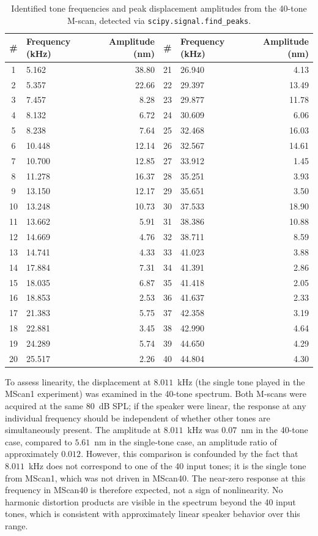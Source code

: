 \documentclass[10pt]{article}
\begin{document}
\begin{table}[ht]
  \centering
  \caption{Identified tone frequencies and peak displacement amplitudes from the 40-tone M-scan, detected via \texttt{scipy.signal.find\_peaks}.}
  \label{tab:40tones}
  \small
  \begin{tabular}{clr|clr}
    \hline
    \# & Frequency (kHz) & Amplitude (nm) & \# & Frequency (kHz) & 
    Amplitude (nm) \\
    \hline
    1  & 5.162  & 38.80 & 21 & 26.940 & 4.13  \\
    2  & 5.357  & 22.66 & 22 & 29.397 & 13.49 \\
    3  & 7.457  & 8.28  & 23 & 29.877 & 11.78 \\
    4  & 8.132  & 6.72  & 24 & 30.609 & 6.06  \\
    5  & 8.238  & 7.64  & 25 & 32.468 & 16.03 \\
    6  & 10.448 & 12.14 & 26 & 32.567 & 14.61 \\
    7  & 10.700 & 12.85 & 27 & 33.912 & 1.45  \\
    8  & 11.278 & 16.37 & 28 & 35.251 & 3.93  \\
    9  & 13.150 & 12.17 & 29 & 35.651 & 3.50  \\
    10 & 13.248 & 10.73 & 30 & 37.533 & 18.90 \\
    11 & 13.662 & 5.91  & 31 & 38.386 & 10.88 \\
    12 & 14.669 & 4.76  & 32 & 38.711 & 8.59  \\
    13 & 14.741 & 4.33  & 33 & 41.023 & 3.88  \\
    14 & 17.884 & 7.31  & 34 & 41.391 & 2.86  \\
    15 & 18.035 & 6.87  & 35 & 41.418 & 2.05  \\
    16 & 18.853 & 2.53  & 36 & 41.637 & 2.33  \\
    17 & 21.383 & 5.75  & 37 & 42.358 & 3.19  \\
    18 & 22.881 & 3.45  & 38 & 42.990 & 4.64  \\
    19 & 24.289 & 5.74  & 39 & 44.650 & 4.29  \\
    20 & 25.517 & 2.26  & 40 & 44.804 & 4.30  \\
    \hline
  \end{tabular}
\end{table}

To assess linearity, the displacement at $8.011$~kHz (the single tone played in the MScan1 experiment) was examined in the 40-tone spectrum. Both M-scans were acquired at the same 80~dB SPL; if the speaker were linear, the response at any individual frequency should be independent of whether other tones are simultaneously present. The amplitude at $8.011$~kHz was $0.07$~nm in the 40-tone case, compared to $5.61$~nm in the single-tone case, an amplitude ratio of approximately $0.012$. However, this comparison is confounded by the fact that $8.011$~kHz does not correspond to one of the 40 input tones; it is the single tone from MScan1, which was not driven in MScan40. The near-zero response at this frequency in MScan40 is therefore expected, not a sign of nonlinearity. No harmonic distortion products are visible in the spectrum beyond the 40 input tones, which is consistent with approximately linear speaker behavior over this range.
\end{document}
